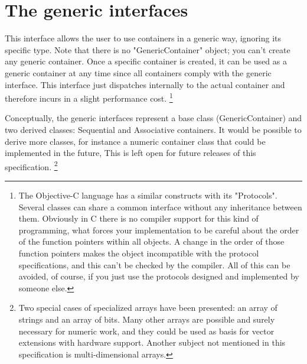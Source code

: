 \documentclass[12pt,a4paper]{memoir} %
\begin{document}
{{\section{The generic interfaces}
This interface allows the user to use containers in a generic way, ignoring its specific type.
Note that there is no "GenericContainer" object; you can't create any generic container. Once a specific container is created, it can be used as a generic container at any time since all containers comply with the generic interface. This interface just dispatches internally to the actual container and therefore incurs in a slight performance cost.
\footnote{
The Objective-C language has a similar constructs with its "Protocols". Several classes can share a common interface without any inheritance between them. Obviously in C there is no compiler support for this kind of programming, what forces your implementation to be careful about the order of the function pointers within all objects. A change in the order of those function pointers makes the object incompatible with the protocol specifications, and this can't be checked by the compiler.
All of this can be avoided, of course, if you just use the protocols designed and implemented by someone else.
}

Conceptually, the generic interfaces represent a base class (GenericContainer) and two derived classes: Sequential and Associative containers.
It would be possible to derive more classes, for instance a numeric container class that could be implemented in the future, This is left open for future releases of this specification.
\footnote{Two special cases of specialized arrays have been presented: an array of strings and an array of bits. Many other arrays are possible and surely necessary for numeric work, and they could be used as basis for vector extensions with hardware support. Another subject not mentioned in this specification  is multi-dimensional arrays.}
}}
\end{document}
